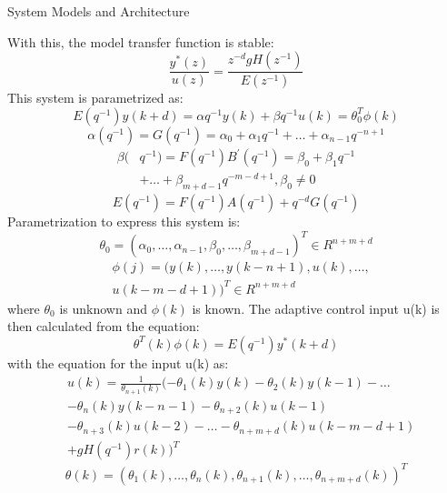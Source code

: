 \begin{section}{System Models and Architecture}
\begin{enumerate}
	\end{enumerate}
With this, the model transfer function is stable:
	\begin{equation}
	\frac{y^*(z)}{u(z)}=\frac{z^{-d}gH(z^{-1})}{E(z^{-1})}
	\end{equation}
This system is parametrized as:
	\begin{equation}
	E(q^{-1})y(k+d)={\alpha}q^{-1}y(k) + {\beta}q^{-1}u(k)=\theta_0^T\phi(k)
	\end{equation}
	\begin{equation}
	\alpha(q^{-1})=G(q^{-1})=\alpha_0+\alpha_1q^{-1}+ \dots +\alpha_{n-1}q^{-n+1}
	\end{equation}
	\begin{align}
	\beta( & q^{-1})=F(q^{-1})B^{'}(q^{-1})=\beta_0+\beta_1q^{-1} \nonumber \\
	& + \dots +\beta_{m+d-1}q^{-m-d+1}, \beta_0\neq0
	\end{align}
	\begin{equation}
	E(q^{-1})=F(q^{-1})A(q^{-1})+q^{-d}G(q^{-1})
	\end{equation}
Parametrization to express this system is:
	\begin{equation}
	\theta_0=(\alpha_0, \dots ,\alpha_{n-1},\beta_0, \dots ,\beta_{m+d-1})^T \in R^{n+m+d}
	\end{equation}
	\begin{align}
	& \phi(j)=(y(k), \dots ,y(k-n+1),u(k), \dots , \nonumber \\
	& u(k-m-d+1))^T \in R^{n+m+d}
	\end{align}
where $\theta_0$ is unknown and $\phi(k)$ is known.
	The adaptive control input u(k) is then calculated from the equation:
	\begin{equation}
	\theta^T(k)\phi(k)=E(q^{-1})y^{*}(k+d)
	\end{equation}
with the equation for the input u(k) as:
	\begin{align}
	& u(k)=\frac{1}{\theta_{n+1}(k)}(-\theta_1(k)y(k)-\theta_2(k)y(k-1)- \dots  \nonumber \\
	& -\theta_n(k)y(k-n-1)-\theta_{n+2}(k)u(k-1) \nonumber \\
	& -\theta_{n+3}(k)u(k-2)- \dots - \theta_{n+m+d}(k)u(k-m-d+1) \nonumber \\
	& +gH(q^{-1})r(k))^T
	\end{align}
	\begin{equation}
	\theta(k)=(\theta_1(k), \dots ,\theta_n(k),\theta_{n+1}(k), \dots ,\theta_{n+m+d}(k))^T
	\end{equation}

\end{section}
